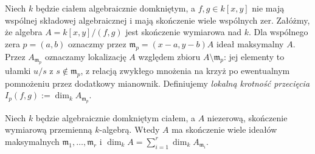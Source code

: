 \begin{definicja}
\label{def:intersection-multiplicity}
Niech $k$ będzie ciałem algebraicznie domkniętym,
a $f,g\in k[x,y]$ nie mają wspólnej składowej algebraicznej
i mają skończenie wiele wspólnych zer.
Załóżmy, że algebra $A=k[x,y]/(f,g)$ jest skończenie wymiarowa
nad $k$. Dla wspólnego zera $p=(a,b)$ oznaczmy przez
$\mathfrak m_p=(x-a,y-b)A$ ideał maksymalny $A$.
Przez $A_{\mathfrak m_p}$ oznaczamy lokalizację $A$
względem zbioru $A\setminus\mathfrak m_p$:
jej elementy to ułamki $u/s$ z $s\notin\mathfrak m_p$,
z relacją zwykłego mnożenia na krzyż po ewentualnym
pomnożeniu przez dodatkowy mianownik.
Definiujemy \emph{lokalną krotność przecięcia}
$I_p(f,g):=\dim_k A_{\mathfrak m_p}$.
\end{definicja}

\begin{lemat}
\label{lem:artin-decomposition}
Niech $k$ będzie algebraicznie domkniętym ciałem,
a $A$ niezerową, skończenie wymiarową przemienną $k$-algebrą.
Wtedy $A$ ma skończenie wiele ideałów maksymalnych
$\mathfrak m_1,\ldots,\mathfrak m_r$ i
$\dim_kA=\sum_{i=1}^r\dim_k A_{\mathfrak m_i}$.
\end{lemat}
